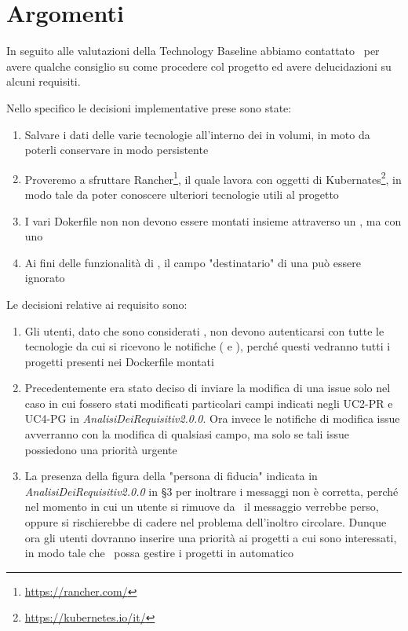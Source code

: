     \section{Argomenti}
    
    In seguito alle valutazioni della Technology Baseline abbiamo contattato \DZ\ per avere qualche consiglio su come procedere col progetto ed avere delucidazioni su alcuni requisiti.
    
    Nello specifico le decisioni implementative prese sono state:
    \begin{enumerate}
        \item Salvare i dati delle varie tecnologie all'interno dei  in volumi, in moto da poterli conservare in modo persistente
        \item Proveremo a sfruttare Rancher\footnote{\url{https://rancher.com/}}, il quale lavora con oggetti di Kubernates\footnote{\url{https://kubernetes.io/it/}}, in modo tale da poter conoscere ulteriori tecnologie utili al progetto
        \item I vari Dokerfile non non devono essere montati insieme attraverso un , ma con uno 
        \item Ai fini delle funzionalità di \progetto, il campo "destinatario" di una  può essere ignorato
    \end{enumerate}

    Le decisioni relative ai requisito sono:
    \begin{enumerate}
        \item Gli utenti, dato che sono considerati , non devono autenticarsi con tutte le tecnologie da cui si ricevono le notifiche ( e ), perché questi vedranno tutti i progetti presenti nei Dockerfile montati
        \item Precedentemente era stato deciso di inviare la modifica di una issue solo nel caso in cui fossero stati modificati particolari campi indicati negli UC2-PR e UC4-PG in \textit{AnalisiDeiRequisitiv2.0.0}. Ora invece le notifiche di modifica issue avverranno con la modifica di qualsiasi campo, ma solo se tali issue possiedono una priorità urgente
        \item La presenza della figura della "persona di fiducia" indicata in \textit{AnalisiDeiRequisitiv2.0.0} in §3 per inoltrare i messaggi non è corretta, perché nel momento in cui un utente si rimuove da \progetto\ il messaggio verrebbe perso, oppure si rischierebbe di cadere nel problema dell'inoltro circolare. Dunque ora gli utenti dovranno inserire una priorità ai progetti a cui sono interessati, in modo tale che \progetto\ possa gestire i progetti in automatico
    \end{enumerate}

